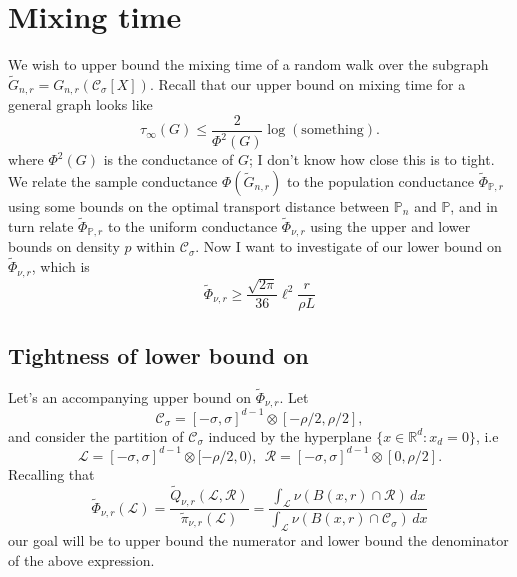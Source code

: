 \documentclass{article}
\newcommand{\Reals}{\mathbb{R}}
\newcommand{\1}{\mathbf{1}}
\newcommand{\Rd}{\Reals^d}
\newcommand{\mc}[1]{\mathcal{#1}}
\newcommand{\Pbb}{\mathbb{P}}
\newcommand{\wt}[1]{\widetilde{#1}}
\theoremstyle{definition}
\theoremstyle{remark}
\begin{document}
\section{Mixing time}
We wish to upper bound the mixing time of a random walk over the subgraph $\wt{G}_{n,r} = G_{n,r}(\mc{C}_{\sigma}[X])$. Recall that our upper bound on mixing time for a general graph looks like
\begin{equation*}
\tau_{\infty}(G) \leq \frac{2}{\Phi^2(G)}\log(\mathrm{something}).
\end{equation*}
where $\Phi^2(G)$ is the conductance of $G$; I don't know how close this is to tight. We relate the sample conductance $\Phi(\wt{G}_{n,r})$ to the population conductance $\wt{\Phi}_{\Pbb,r}$ using some bounds on the optimal transport distance between $\mathbb{P}_n$ and $\mathbb{P}$, and in turn relate $\wt{\Phi}_{\Pbb,r}$ to the uniform conductance $\wt{\Phi}_{\nu,r}$ using the upper and lower bounds on density $p$ within $\mc{C}_{\sigma}$. Now I want to investigate of our lower bound on $\wt{\Phi}_{\nu,r}$, which is
\begin{equation*}
\wt{\Phi}_{\nu,r} \geq \frac{\sqrt{2\pi}}{36} \ell^2 \frac{r}{\rho L}
\end{equation*}

\subsection{Tightness of lower bound on }
Let's an accompanying upper bound on $\wt{\Phi}_{\nu,r}$. Let 
\begin{equation*}
\mc{C}_{\sigma} = [-\sigma,\sigma]^{d - 1} \otimes [-\rho/2,\rho/2],
\end{equation*}
and consider the partition of $\mc{C}_{\sigma}$ induced by the hyperplane $\{x \in \Rd: x_d = 0\}$, i.e
\begin{equation*}
\mc{L} = [-\sigma,\sigma]^{d - 1} \otimes [-\rho/2,0),~~\mc{R} = [-\sigma,\sigma]^{d - 1} \otimes [0,\rho/2].
\end{equation*}
Recalling that 
\begin{equation*}
\wt{\Phi}_{\nu,r}(\mc{L}) = \frac{\wt{Q}_{\nu,r}(\mc{L},\mc{R})}{\wt{\pi}_{\nu,r}(\mc{L})} = \frac{\int_{\mc{L}} \nu(B(x,r) \cap \mc{R}) \,dx}{\int_{\mc{L}} \nu(B(x,r) \cap \mc{C}_{\sigma}) \,dx} 
\end{equation*}
our goal will be to upper bound the numerator and lower bound the denominator of the above expression.
\end{document}
